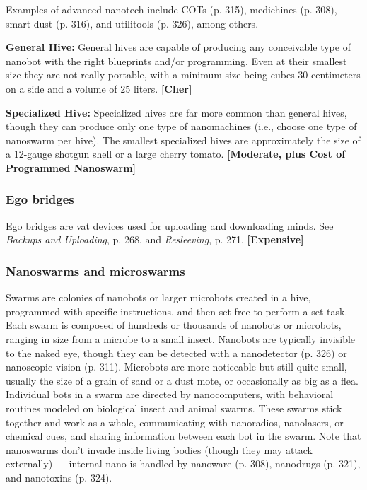 {{Examples of advanced nanotech include COTs (p. 315), medichines (p. 308), smart dust (p. 316), and utilitools (p. 326), among others. 

\textbf{General Hive:} General hives are capable of producing any conceivable type of nanobot with the right blueprints and/or programming. Even at their smallest size they are not really portable, with a minimum size being cubes 30 centimeters on a side and a volume of 25 liters. \textbf{[Cher]} 

\textbf{Specialized Hive:} Specialized hives are far more common than general hives, though they can produce only one type of nanomachines (i.e., choose one type of nanoswarm per hive). The smallest specialized hives are approximately the size of a 12-gauge shotgun shell or a large cherry tomato. \textbf{[Moderate, plus Cost of Programmed Nanoswarm]} 

\subsubsection{Ego bridges} 

Ego bridges are vat devices used for uploading and downloading minds. See \emph{Backups and Uploading}, p. 268, and \emph{Resleeving}, p. 271. \textbf{[Expensive]} 

\subsubsection{Nanoswarms and microswarms} 

Swarms are colonies of nanobots or larger microbots created in a hive, programmed with specific instructions, and then set free to perform a set task. Each swarm is composed of hundreds or thousands of nanobots or microbots, ranging in size from a microbe to a small insect. Nanobots are typically invisible to the naked eye, though they can be detected with a nanodetector (p. 326) or nanoscopic vision (p. 311). Microbots are more noticeable but still quite small, usually the size of a grain of sand or a dust mote, or occasionally as big as a flea. Individual bots in a swarm are directed by nanocomputers, with behavioral routines modeled on biological insect and animal swarms. These swarms stick together and work as a whole, communicating with nanoradios, nanolasers, or chemical cues, and sharing information between each bot in the swarm. Note that nanoswarms don’t invade inside living bodies (though they may attack externally) --- internal nano is handled by nanoware (p. 308), nanodrugs (p. 321), and nanotoxins (p. 324). 

}}
